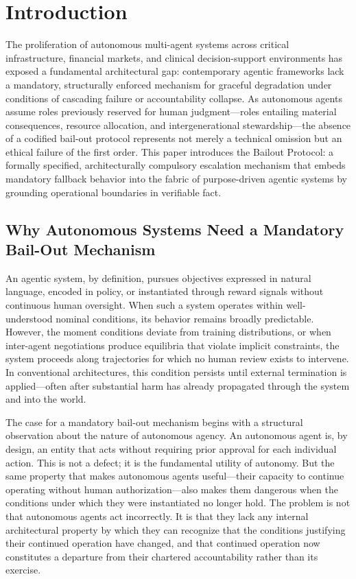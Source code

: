 \section{Introduction}
\label{sec:intro}

The proliferation of autonomous multi-agent systems across critical infrastructure, financial markets, and clinical decision-support environments has exposed a fundamental architectural gap: contemporary agentic frameworks lack a mandatory, structurally enforced mechanism for graceful degradation under conditions of cascading failure or accountability collapse. As autonomous agents assume roles previously reserved for human judgment—roles entailing material consequences, resource allocation, and intergenerational stewardship—the absence of a codified bail-out protocol represents not merely a technical omission but an ethical failure of the first order. This paper introduces the \bxthree Bailout Protocol: a formally specified, architecturally compulsory escalation mechanism that embeds mandatory fallback behavior into the fabric of purpose-driven agentic systems by grounding operational boundaries in verifiable fact.

\subsection{Why Autonomous Systems Need a Mandatory Bail-Out Mechanism}

An agentic system, by definition, pursues objectives expressed in natural language, encoded in policy, or instantiated through reward signals without continuous human oversight. When such a system operates within well-understood nominal conditions, its behavior remains broadly predictable. However, the moment conditions deviate from training distributions, or when inter-agent negotiations produce equilibria that violate implicit constraints, the system proceeds along trajectories for which no human review exists to intervene. In conventional architectures, this condition persists until external termination is applied—often after substantial harm has already propagated through the system and into the world.

The case for a mandatory bail-out mechanism begins with a structural observation about the nature of autonomous agency. An autonomous agent is, by design, an entity that acts without requiring prior approval for each individual action. This is not a defect; it is the fundamental utility of autonomy. But the same property that makes autonomous agents useful—their capacity to continue operating without human authorization—also makes them dangerous when the conditions under which they were instantiated no longer hold. The problem is not that autonomous agents act incorrectly. It is that they lack any internal architectural property by which they can recognize that the conditions justifying their continued operation have changed, and that continued operation now constitutes a departure from their chartered accountability rather than its exercise.


